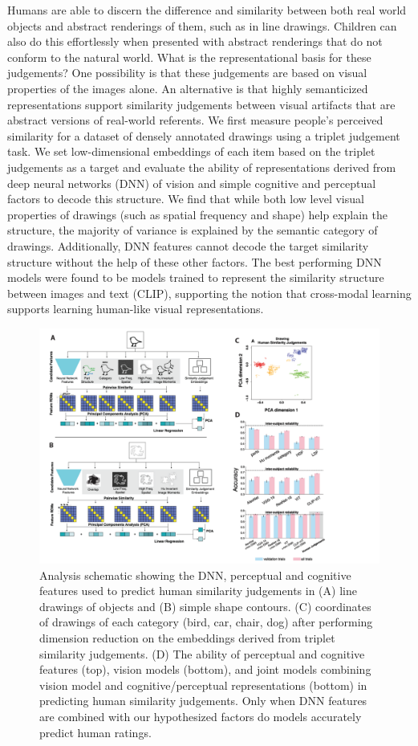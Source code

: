 \documentclass{Dissertate}
\begin{document}
Humans are able to discern the difference and similarity between both real world objects and abstract renderings of them, such as in line drawings.
Children can also do this effortlessly when presented with abstract renderings that do not conform to the natural world. 
What is the representational basis for these judgements? 
One possibility is that these judgements are based on visual properties of the images alone.
An alternative is that highly semanticized representations support similarity judgements between visual artifacts that are abstract versions of real-world referents.
We first measure people's perceived similarity for a dataset of densely annotated drawings using a triplet judgement task.
We set low-dimensional embeddings of each item based on the triplet judgements as a target and evaluate the ability of representations derived from deep neural networks (DNN) of vision and simple cognitive and perceptual factors to decode this structure.
We find that while both low level visual properties of drawings (such as spatial frequency and shape) help explain the structure, the majority of variance is explained by the semantic category of drawings.
Additionally, DNN features cannot decode the target similarity structure without the help of these other factors.
The best performing DNN models were found to be models trained to represent the similarity structure between images and text (CLIP), supporting the notion that cross-modal learning supports learning human-like visual representations.
\begin{figure}[htpb!]
    \centering
    \includegraphics[width=.8\linewidth]{proposal/figures/chap2.pdf}
    \caption{Analysis schematic showing the DNN, perceptual and cognitive features used to predict human similarity judgements in (A) line drawings of objects and (B) simple shape contours. (C) coordinates of drawings of each category (bird, car, chair, dog) after performing dimension reduction on the embeddings derived from triplet similarity judgements. (D) The ability of perceptual and cognitive features (top), vision models (bottom), and joint models combining vision model and cognitive/perceptual representations (bottom) in predicting human similarity judgements. Only when DNN features are combined with our hypothesized factors do models accurately predict human ratings.  } 
    \label{fig:chap2}
\end{figure}
\end{document}
